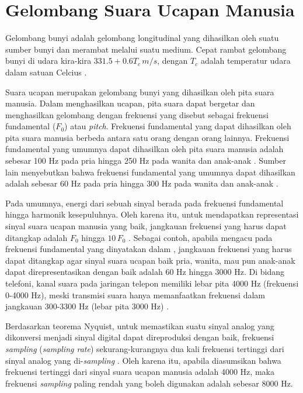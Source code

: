 \section{Gelombang Suara Ucapan Manusia}

Gelombang bunyi adalah gelombang longitudinal yang dihasilkan oleh suatu sumber bunyi dan merambat melalui suatu medium. Cepat rambat gelombang bunyi di udara kira-kira $331.5 + 0.6 T_c \, m/s$, dengan $T_c$ adalah temperatur udara dalam satuan Celcius \cite{huang2001}.

Suara ucapan merupakan gelombang bunyi yang dihasilkan oleh pita suara manusia. Dalam menghasilkan ucapan, pita suara dapat bergetar dan menghasilkan gelombang dengan frekuensi yang disebut sebagai frekuensi fundamental ($F_0$) atau \textit{pitch}. Frekuensi fundamental yang dapat dihasilkan oleh pita suara manusia berbeda antara satu orang dengan orang lainnya. Frekuensi fundamental yang umumnya dapat dihasilkan oleh pita suara manusia adalah sebesar 100 Hz pada pria hingga 250 Hz pada wanita dan anak-anak \cite{rabiner2007}. Sumber lain menyebutkan bahwa frekuensi fundamental yang umumnya dapat dihasilkan adalah sebesar 60 Hz pada pria hingga 300 Hz pada wanita dan anak-anak \cite{huang2001}.

Pada umumnya, energi dari sebuah sinyal berada pada frekuensi fundamental hingga harmonik kesepuluhnya. Oleh karena itu, untuk mendapatkan representasi sinyal suara ucapan manusia yang baik, jangkauan frekuensi yang harus dapat ditangkap adalah $F_0$ hingga $10 \, F_0$ \cite{baken1999}. Sebagai contoh, apabila mengacu pada frekuensi fundamental yang dinyatakan dalam \cite{huang2001}, jangkauan frekuensi yang harus dapat ditangkap agar sinyal suara ucapan baik pria, wanita, mau pun anak-anak dapat direpresentasikan dengan baik adalah 60 Hz hingga 3000 Hz. Di bidang telefoni, kanal suara pada jaringan telepon memiliki lebar pita 4000 Hz (frekuensi 0-4000 Hz), meski transmisi suara hanya memanfaatkan frekuensi dalam jangkauan 300-3300 Hz (lebar pita 3000 Hz) \cite{forouzan2003}.

Berdasarkan teorema Nyquist, untuk memastikan suatu sinyal analog yang dikonversi menjadi sinyal digital dapat direproduksi dengan baik, frekuensi \textit{sampling} (\textit{sampling rate}) sekurang-kurangnya dua kali frekuensi tertinggi dari sinyal analog yang di-\textit{sampling} \cite{forouzan2003, baken1999}. Oleh karena itu, apabila diasumsikan bahwa frekuensi tertinggi dari sinyal suara ucapan manusia adalah 4000 Hz, maka frekuensi \textit{sampling} paling rendah yang boleh digunakan adalah sebesar 8000 Hz.
